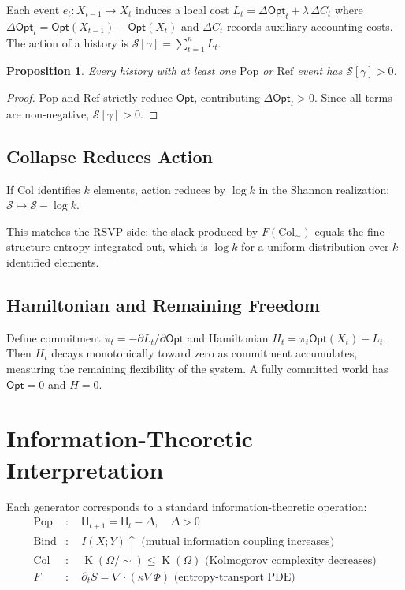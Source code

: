 \documentclass[12pt,a4paper]{article}
\newtheorem{proposition}[theorem]{Proposition}
\theoremstyle{definition}
\theoremstyle{remark}
\newcommand{\Ent}{\mathsf{H}}
\newcommand{\Opt}{\mathsf{Opt}}
\newcommand{\Pop}{\mathrm{Pop}}
\newcommand{\Ref}{\mathrm{Ref}}
\newcommand{\Bind}{\mathrm{Bind}}
\newcommand{\Col}{\mathrm{Col}}
\DeclareMathOperator{\Kc}{K}
\newcommand{\PhiF}{\Phi}
\newcommand{\SF}{S}
\begin{document}
Each event $e_t:X_{t-1}\to X_t$ induces a local cost
$L_t=\Delta\Opt_t+\lambda\,\Delta C_t$ where
$\Delta\Opt_t=\Opt(X_{t-1})-\Opt(X_t)$ and $\Delta C_t$ records auxiliary
accounting costs. The action of a history is
$\mathcal{S}[\gamma]=\sum_{t=1}^n L_t.$

\begin{proposition}
Every history with at least one $\Pop$ or $\Ref$ event has $\mathcal{S}[\gamma]>0$.
\end{proposition}

\begin{proof}
$\Pop$ and $\Ref$ strictly reduce $\Opt$, contributing $\Delta\Opt_t>0$. Since all
terms are non-negative, $\mathcal{S}[\gamma]>0$.
\end{proof}

\subsection{Collapse Reduces Action}

If $\Col$ identifies $k$ elements, action reduces by $\log k$ in the Shannon
realization: $\mathcal{S}\mapsto\mathcal{S}-\log k$.

This matches the RSVP side: the slack produced by $F(\Col_\sim)$ equals the
fine-structure entropy integrated out, which is $\log k$ for a uniform distribution
over $k$ identified elements.

\subsection{Hamiltonian and Remaining Freedom}

Define commitment $\pi_t=-\partial L_t/\partial\Opt$ and Hamiltonian
$H_t=\pi_t\Opt(X_t)-L_t$. Then $H_t$ decays monotonically toward zero as commitment
accumulates, measuring the remaining flexibility of the system. A fully committed world
has $\Opt=0$ and $H=0$.

\section{Information-Theoretic Interpretation}
\label{sec:info}

Each generator corresponds to a standard information-theoretic operation:
\begin{align*}
\Pop &:\quad\Ent_{t+1}=\Ent_t-\Delta,\quad\Delta>0 \\
\Bind &:\quad I(X;Y)\uparrow\text{ (mutual information coupling increases)} \\
\Col &:\quad\Kc(\Omega/{\sim})\le\Kc(\Omega)\text{ (Kolmogorov complexity decreases)} \\
F &:\quad\partial_t\SF=\nabla\cdot(\kappa\nabla\PhiF)\text{ (entropy-transport PDE)}
\end{align*}
\end{document}
